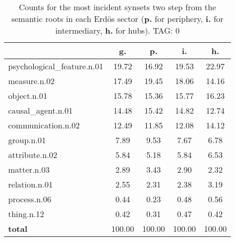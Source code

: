 \begin{table}[h!]
\begin{center}
\begin{tabular}{| l || c | c | c | c |}\hline
 & {\bf g.} & {\bf p.} & {\bf i.} & {\bf h.} \\\hline\hline
psychological\_feature.n.01 & 19.72  & 16.92  & 19.53  & 22.97 \\\hline
measure.n.02 & 17.49  & 19.45  & 18.06  & 14.16 \\\hline
object.n.01 & 15.78  & 15.36  & 15.77  & 16.23 \\\hline
causal\_agent.n.01 & 14.48  & 15.42  & 14.82  & 12.74 \\\hline
communication.n.02 & 12.49  & 11.85  & 12.08  & 14.12 \\\hline
group.n.01 & 7.89  & 9.53  & 7.67  & 6.78 \\\hline
attribute.n.02 & 5.84  & 5.18  & 5.84  & 6.53 \\\hline
matter.n.03 & 2.89  & 3.43  & 2.90  & 2.32 \\\hline
relation.n.01 & 2.55  & 2.31  & 2.38  & 3.19 \\\hline
process.n.06 & 0.44  & 0.23  & 0.48  & 0.56 \\\hline
thing.n.12 & 0.42  & 0.31  & 0.47  & 0.42 \\\hline\hline
{{\bf total}} & 100.00  & 100.00  & 100.00  & 100.00 \\\hline
\end{tabular}
\caption{Counts for the most incident synsets two step from the semantic roots in each Erd\"os sector ({\bf p.} for periphery, {\bf i.} for intermediary, {\bf h.} for hubs). TAG: 0}
\end{center}
\end{table}